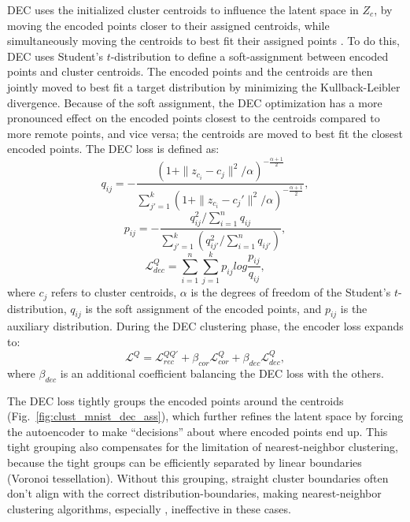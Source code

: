 			\ac{DEC} uses the initialized cluster centroids to influence the latent space in $Z_c$, by moving the encoded points closer to their assigned centroids, while simultaneously moving the centroids to best fit their assigned points \cite{dec}.
			To do this, \ac{DEC} uses Student's $t$-distribution to define a soft-assignment between encoded points and cluster centroids.		
			The encoded points and the centroids are then jointly moved to best fit a target distribution by minimizing the Kullback-Leibler divergence.
			Because of the soft assignment, the \ac{DEC} optimization has a more pronounced effect on the encoded points closest to the centroids compared to more remote points, and vice versa; the centroids are moved to best fit the closest encoded points.
			The \ac{DEC} loss is defined as:
			\begin{equation}
				q_{ij} = -\frac{ (1 + \|z_{c_i} - c_j\|^2/\alpha)^{-\frac{\alpha + 1}{2}} }{ \sum_{j'=1}^{k} (1 + \|z_{c_i} - c_j'\|^2/\alpha)^{-\frac{\alpha + 1}{2}} },
			\end{equation}
			\begin{equation}
				p_{ij} = -\frac{ q_{ij}^2 / \sum_{i=1}^{n} q_{ij} }{ \sum_{j'=1}^{k} (q_{ij'}^2 / \sum_{i=1}^{n} q_{ij'}) },
			\end{equation}
			\begin{equation}
				\label{eq:l_q_dec}
				\mathcal{L}^Q_{dec} = \sum_{i=1}^{n} \sum_{j=1}^{k} p_{ij}log \frac{p_{ij}}{q_{ij}},
			\end{equation}
			\noindent where $c_j$ refers to cluster centroids, $\alpha$ is the degrees of freedom of the Student’s $t$-distribution, $q_{ij}$ is the soft assignment of the encoded points, and $p_{ij}$ is the auxiliary distribution.
			During the \ac{DEC} clustering phase, the encoder loss expands to:
			\begin{equation}
				\mathcal{L}^Q = \mathcal{L}^{QQ'}_{rec} + \beta_{cor}\mathcal{L}^Q_{cor} + \beta_{dec}\mathcal{L}^Q_{dec},
			\end{equation}
			\noindent where $\beta_{dec}$ is an additional coefficient balancing the \ac{DEC} loss with the others.
			
			The \ac{DEC} loss tightly groups the encoded points around the centroids (Fig.~\ref{fig:clust_mnist_dec_ass}), which further refines the latent space by forcing the autoencoder to make ``decisions'' about where encoded points end up.
			This tight grouping also compensates for the limitation of nearest-neighbor clustering, because the tight groups can be efficiently separated by linear boundaries (Voronoi tessellation).
			Without this grouping, straight cluster boundaries often don't align with the correct distribution-boundaries, making nearest-neighbor clustering algorithms, especially \kmeans{}, ineffective in these cases.
			
